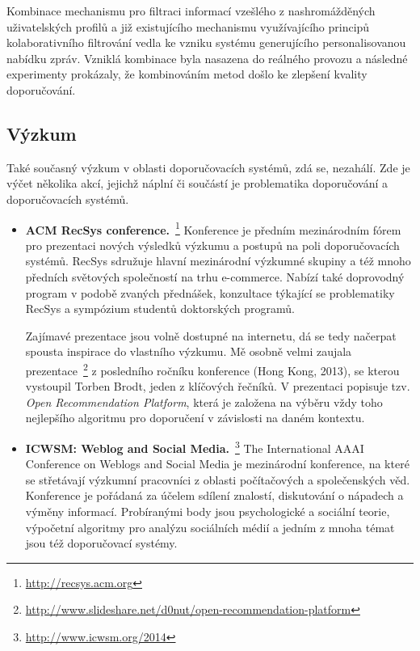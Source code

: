 \documentclass[thesis=M,czech]{FITthesis}[2014/05/07]
\begin{document}
Kombinace mechanismu pro filtraci informací vzešlého z nashromážděných uživatelských profilů a již existujícího mechanismu využívajícího principů kolaborativního filtrování vedla ke vzniku systému generujícího personalisovanou nabídku zpráv. Vzniklá kombinace byla nasazena do reálného provozu a následné experimenty prokázaly, že kombinováním metod došlo ke zlepšení kvality doporučování.

\subsection{Výzkum}

Také současný výzkum v oblasti doporučovacích systémů, zdá se, nezahálí. Zde je výčet několika akcí, jejichž náplní či součástí je problematika doporučování a doporučovacích systémů.

\begin{itemize}
  \item \textbf{ACM RecSys conference.}~\footnote{\url{http://recsys.acm.org}} Konference je předním mezinárodním fórem pro prezentaci nových výsledků výzkumu a postupů na poli doporučovacích systémů. RecSys sdružuje hlavní mezinárodní výzkumné skupiny a též mnoho předních světových společností na trhu e-commerce. Nabízí také doprovodný program v podobě zvaných přednášek, konzultace týkající se problematiky RecSys a sympózium studentů doktorských programů. 
  
  Zajímavé prezentace jsou volně dostupné na internetu, dá se tedy načerpat spousta inspirace do vlastního výzkumu. Mě osobně velmi zaujala prezentace~\footnote{\url{http://www.slideshare.net/d0nut/open-recommendation-platform}} z posledního ročníku konference (Hong Kong, 2013), se kterou vystoupil Torben Brodt, jeden z klíčových řečníků. V prezentaci popisuje tzv. \emph{Open Recommendation Platform}, která je založena na výběru vždy toho nejlepšího algoritmu pro doporučení v závislosti na daném kontextu. 
  
  \item \textbf{ICWSM: Weblog and Social Media.}~\footnote{\url{http://www.icwsm.org/2014}} The International AAAI Conference on Weblogs and Social Media je mezinárodní konference, na které se střetávají výzkumní pracovníci z oblasti počítačových a společenských věd. Konference je pořádaná za účelem sdílení znalostí, diskutování o nápadech a výměny informací. Probíranými body jsou psychologické a sociální teorie, výpočetní algoritmy pro analýzu sociálních médií a jedním z mnoha témat jsou též doporučovací systémy.
\end{itemize}
\end{document}
